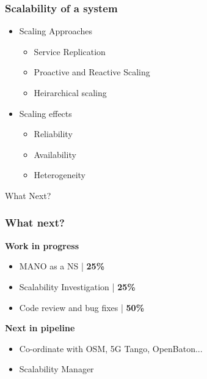 \begin{frame}
\frametitle{Scalability of a system}
\begin{itemize}
    \item Scaling Approaches
            \begin{itemize}
                \item Service Replication
                \item Proactive and Reactive Scaling
                \item Heirarchical scaling
        \end{itemize}   
    \pause
    \item Scaling effects
    \begin{itemize}
        \item Reliability
        \item Availability 
        \item Heterogeneity
        
    \end{itemize}
    
\end{itemize}
\end{frame}
\begin{frame}
\Huge{\centerline{What Next?}}
\end{frame}
\begin{frame}
\frametitle{What next?} 
\begin{block}{\textbf{Work in progress}}
\begin{itemize}
    \item MANO as a NS | \textbf{25\%}  
    \item Scalability Investigation | \textbf{25\%}
    \item Code review and bug fixes | \textbf{50\%} 
    
\end{itemize}
\end{block}
\begin{block}{\textbf{Next in pipeline}}
    \begin{itemize}
        \item Co-ordinate with OSM, 5G Tango, OpenBaton...      
        \item Scalability Manager           
    \end{itemize}
\end{block}
\end{frame}